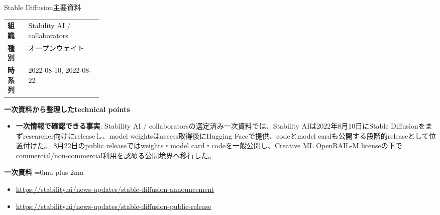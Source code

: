 \begin{technicalnote}{Stable Diffusion}{主要資料}
\begingroup
\begin{tabularx}{\linewidth}{@{}>{\bfseries}p{0.22\linewidth}X@{}}
組織 & Stability AI / collaborators \\
種別 & オープンウェイト \\
時系列 & 2022-08-10, 2022-08-22 \\
\end{tabularx}
\smallskip
{\bfseries 一次資料から整理したtechnical points}
\begin{itemize}[leftmargin=1.5em,itemsep=0.35em]
\item \textbf{一次情報で確認できる事実}: Stability AI / collaboratorsの選定済み一次資料では、Stability AIは2022年8月10日にStable Diffusionをまずresearcher向けにreleaseし、model weightsはaccess取得後にHugging Faceで提供、codeとmodel cardも公開する段階的releaseとして位置付けた。 8月22日のpublic releaseではweights・model card・codeを一般公開し、Creative ML OpenRAIL-M licenseの下でcommercial/non-commercial利用を認める公開境界へ移行した。
\end{itemize}
\begin{minipage}{\linewidth}
\begin{samepage}
{\bfseries 一次資料}
\begingroup\sloppy
\Urlmuskip=0mu plus 2mu\relax
\begin{itemize}[leftmargin=1.5em,itemsep=0.25em]
\item {\scriptsize\url{https://stability.ai/news-updates/stable-diffusion-announcement}}
\item {\scriptsize\url{https://stability.ai/news-updates/stable-diffusion-public-release}}
\end{itemize}
\endgroup
\end{samepage}
\end{minipage}
\endgroup
\end{technicalnote}
\medskip

